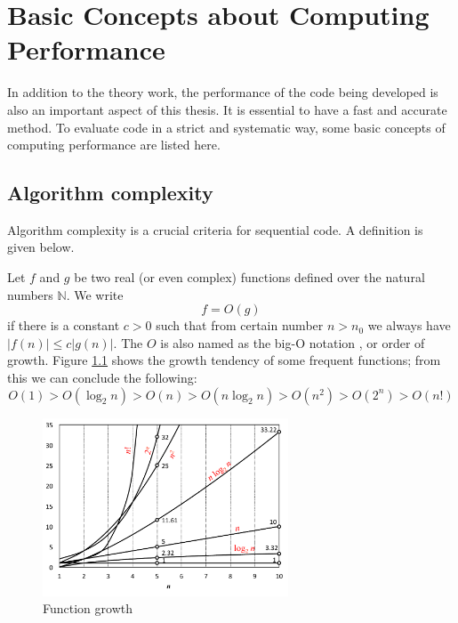 
\chapter{Basic Concepts about Computing Performance\label{chpt:computing-performance}}

In addition to the theory work, the performance of the code being
developed is also an important aspect of this thesis. It is essential
to have a fast and accurate method. To evaluate code in a strict and
systematic way, some basic concepts of computing performance are listed
here. 

\section{Algorithm complexity}

Algorithm complexity is a crucial criteria for sequential code. A
definition is given below.

Let $f$ and $g$ be two real (or even complex) functions defined
over the natural numbers $\mathbb{N}$. We write
\begin{equation}
f=O(g)
\end{equation}
if there is a constant $c>0$ such that from certain number $n>n_{0}$
we always have $\left|f(n)\right|\leq c\left|g(n)\right|.$ The $O$
is also named as the big-O notation \citep{Complexity}, or order
of growth. Figure \ref{fig:order-of-growth} shows the growth tendency
of some frequent functions; from this we can conclude the following:
\begin{equation}
O(1)>O(\log_{2}n)>O(n)>O(n\log_{2}n)>O(n^{2})>O(2^{n})>O(n!)
\end{equation}

\begin{figure}[h]
\begin{centering}
\includegraphics[width=0.65\textwidth]{_figure/orders-of-growth}
\par\end{centering}
\caption{Function growth\label{fig:order-of-growth}}
\end{figure}


